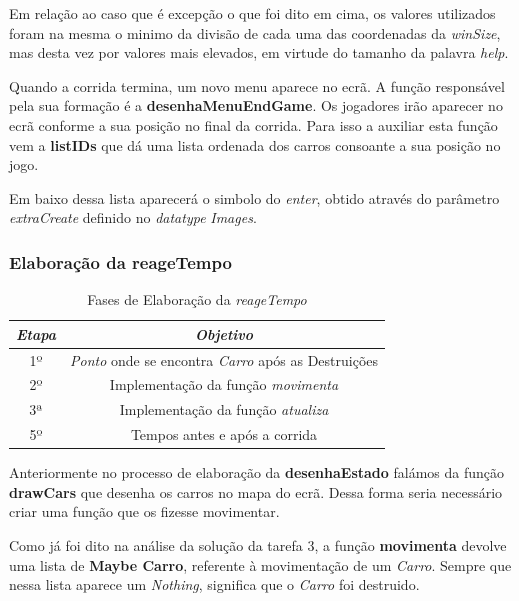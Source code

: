 \documentclass[a4paper]{report} %
\begin{document}
Em relação ao caso que é excepção o que foi dito em cima, os valores utilizados foram na mesma o minimo da divisão de cada uma das coordenadas da \emph{winSize}, mas desta vez por valores mais elevados, em virtude do tamanho da palavra \textit{help}.

Quando a corrida termina, um novo menu aparece no ecrã. A função responsável pela sua formação é a \textbf{desenhaMenuEndGame}. Os jogadores irão aparecer no ecrã conforme a sua posição no final da corrida. Para isso a auxiliar esta função vem a \textbf{listIDs} que dá uma lista ordenada dos carros consoante a sua posição no jogo. 

Em baixo dessa lista aparecerá o simbolo do \textit{enter}, obtido através do parâmetro \emph{extraCreate} definido no \textit{datatype} \emph{Images}. 

\newpage

\subsubsection{Elaboração da \textbf{reageTempo}}

\begin{table}[!h]
\begin{center}
\begin{tabular}{|c|c|}
    \hline
  \emph{Etapa} & \emph{Objetivo} \\
    \hline
  1º & \emph{Ponto} onde se encontra \emph{Carro} após as Destruições \\
    \hline
  2º & Implementação da função \emph{movimenta} \\
    \hline  
  3ª & Implementação da função \emph{atualiza}\\
    \hline
  5º & Tempos antes e após a corrida\\
    \hline

\end{tabular}
\end{center}
\caption{Fases de Elaboração da \emph{reageTempo}}
\end{table}


Anteriormente no processo de elaboração da \textbf{desenhaEstado} falámos da função \textbf{drawCars} que desenha os carros no mapa do ecrã. Dessa forma seria necessário criar uma função que os fizesse movimentar.

Como já foi dito na análise da solução da tarefa 3, a função \textbf{movimenta} devolve uma lista de \textbf{Maybe Carro}, referente à movimentação de um \emph{Carro}. Sempre que nessa lista aparece um \emph{Nothing}, significa que o \emph{Carro} foi destruido. 
\end{document}
